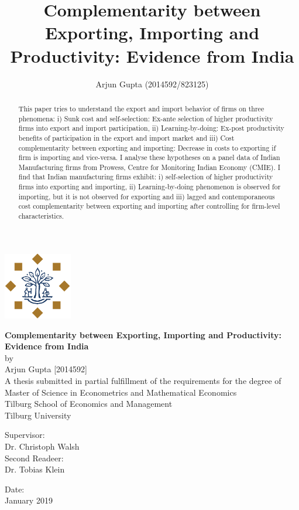 \documentclass[12pt]{article}
\title{Complementarity between Exporting, Importing and Productivity: Evidence from India}
\author{Arjun Gupta (2014592/823125)}
\begin{document}

\begin{center}
\includegraphics[width=3cm]{./PICS/tilburg.png}
\bigskip
\bigskip
\bigskip
\bigskip

 \textbf{\Large Complementarity between Exporting, Importing and Productivity:
  Evidence from India}\\
\bigskip
\bigskip
by\\
Arjun Gupta [2014592]\\

\bigskip
\bigskip
\bigskip
\bigskip
 A thesis submitted in partial fulfillment of the requirements for the
 degree of Master of Science in Econometrics and Mathematical
 Economics \\
 \bigskip
\bigskip
\bigskip
\bigskip
 Tilburg School of Economics and Management\\
 Tilburg University\\
 \bigskip
\bigskip
\bigskip
\bigskip

Supervisor: \\
Dr. Christoph Walsh\\
 \bigskip
\bigskip
\bigskip
\bigskip
Second Readeer: \\
Dr. Tobias Klein\\
 \bigskip
\bigskip
\bigskip
\bigskip

Date:\\
January 2019

\maketitle
\end{center}

%  

\begin{abstract}
This paper tries to understand the export and import behavior of
firms on three phenomena: i) Sunk cost and self-selection: Ex-ante selection of higher
productivity firms into export and import participation,
ii) Learning-by-doing: Ex-post productivity benefits of participation
in the export and import market and iii) Cost complementarity between exporting
and importing: Decrease in costs to exporting if firm is importing and
vice-versa. I analyse these hypotheses on a panel data of Indian
Manufacturing firms from Prowess, Centre for Monitoring Indian Economy
(CMIE). I find that Indian manufacturing firms exhibit: i) self-selection of higher productivity
firms into exporting and importing, ii) Learning-by-doing phenomenon
is observed for importing, but it is not observed for exporting and
iii) lagged and contemporaneous cost complementarity between exporting
and importing after controlling for firm-level characteristics.  
\end{abstract}
\bigskip
\end{document}
